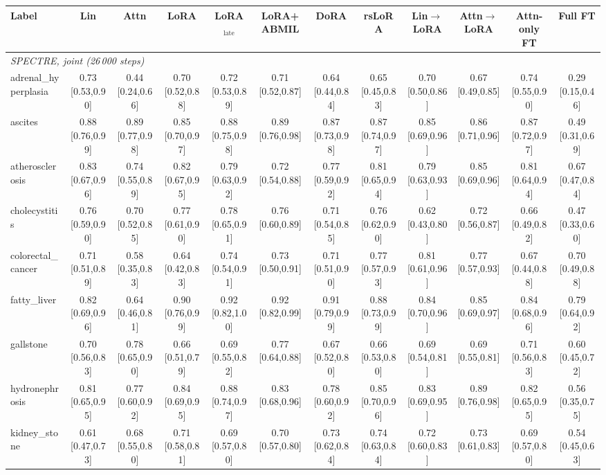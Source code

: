 \begin{tabular}{lccccccccccc}
\toprule
Label & Lin & Attn & LoRA & LoRA$_{\text{late}}$ & LoRA+ABMIL & DoRA & rsLoRA & Lin$\to$LoRA & Attn$\to$LoRA & Attn-only FT & Full FT \\
\midrule
\multicolumn{12}{l}{\textit{SPECTRE, joint (26\,000 steps)}} \\
adrenal\_hyperplasia & 0.73 [0.53,0.90] & 0.44 [0.24,0.66] & 0.70 [0.52,0.88] & 0.72 [0.53,0.89] & 0.71 [0.52,0.87] & 0.64 [0.44,0.84] & 0.65 [0.45,0.83] & 0.70 [0.50,0.86] & 0.67 [0.49,0.85] & 0.74 [0.55,0.90] & 0.29 [0.15,0.46] \\
ascites & 0.88 [0.76,0.99] & 0.89 [0.77,0.98] & 0.85 [0.70,0.97] & 0.88 [0.75,0.98] & 0.89 [0.76,0.98] & 0.87 [0.73,0.98] & 0.87 [0.74,0.97] & 0.85 [0.69,0.96] & 0.86 [0.71,0.96] & 0.87 [0.72,0.97] & 0.49 [0.31,0.69] \\
atherosclerosis & 0.83 [0.67,0.96] & 0.74 [0.55,0.89] & 0.82 [0.67,0.95] & 0.79 [0.63,0.92] & 0.72 [0.54,0.88] & 0.77 [0.59,0.92] & 0.81 [0.65,0.94] & 0.79 [0.63,0.93] & 0.85 [0.69,0.96] & 0.81 [0.64,0.94] & 0.67 [0.47,0.84] \\
cholecystitis & 0.76 [0.59,0.90] & 0.70 [0.52,0.85] & 0.77 [0.61,0.90] & 0.78 [0.65,0.91] & 0.76 [0.60,0.89] & 0.71 [0.54,0.85] & 0.76 [0.62,0.90] & 0.62 [0.43,0.80] & 0.72 [0.56,0.87] & 0.66 [0.49,0.82] & 0.47 [0.33,0.60] \\
colorectal\_cancer & 0.71 [0.51,0.89] & 0.58 [0.35,0.83] & 0.64 [0.42,0.83] & 0.74 [0.54,0.91] & 0.73 [0.50,0.91] & 0.71 [0.51,0.90] & 0.77 [0.57,0.93] & 0.81 [0.61,0.96] & 0.77 [0.57,0.93] & 0.67 [0.44,0.88] & 0.70 [0.49,0.88] \\
fatty\_liver & 0.82 [0.69,0.96] & 0.64 [0.46,0.81] & 0.90 [0.76,0.99] & 0.92 [0.82,1.00] & 0.92 [0.82,0.99] & 0.91 [0.79,0.99] & 0.88 [0.73,0.99] & 0.84 [0.70,0.96] & 0.85 [0.69,0.97] & 0.84 [0.68,0.96] & 0.79 [0.64,0.92] \\
gallstone & 0.70 [0.56,0.83] & 0.78 [0.65,0.90] & 0.66 [0.51,0.79] & 0.69 [0.55,0.82] & 0.77 [0.64,0.88] & 0.67 [0.52,0.80] & 0.66 [0.53,0.80] & 0.69 [0.54,0.81] & 0.69 [0.55,0.81] & 0.71 [0.56,0.83] & 0.60 [0.45,0.72] \\
hydronephrosis & 0.81 [0.65,0.95] & 0.77 [0.60,0.92] & 0.84 [0.69,0.95] & 0.88 [0.74,0.97] & 0.83 [0.68,0.96] & 0.78 [0.60,0.92] & 0.85 [0.70,0.96] & 0.83 [0.69,0.95] & 0.89 [0.76,0.98] & 0.82 [0.65,0.95] & 0.56 [0.35,0.75] \\
kidney\_stone & 0.61 [0.47,0.73] & 0.68 [0.55,0.80] & 0.71 [0.58,0.81] & 0.69 [0.57,0.80] & 0.70 [0.57,0.80] & 0.73 [0.62,0.84] & 0.74 [0.63,0.84] & 0.72 [0.60,0.83] & 0.73 [0.61,0.83] & 0.69 [0.57,0.80] & 0.54 [0.45,0.63] \\

\end{tabular}
